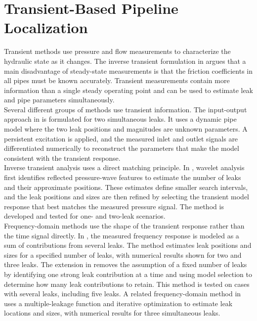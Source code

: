 \section{Transient-Based Pipeline Localization}
\label{sec:lit:transients}

Transient methods use pressure and flow measurements to characterize the hydraulic state as it changes. The inverse transient formulation in \cite{liggett1994} argues that a main disadvantage of steady-state measurements is that the friction coefficients in all pipes must be known accurately. Transient measurements contain more information than a single steady operating point and can be used to estimate leak and pipe parameters simultaneously. \\

Several different groups of methods use transient information. The input-output approach in \cite{diaz2021} is formulated for two simultaneous leaks. It uses a dynamic pipe model where the two leak positions and magnitudes are unknown parameters. A persistent excitation is applied, and the measured inlet and outlet signals are differentiated numerically to reconstruct the parameters that make the model consistent with the transient response.\\

Inverse transient analysis uses a direct matching principle. In \cite{nadian2025}, wavelet analysis first identifies reflected pressure-wave features to estimate the number of leaks and their approximate positions. These estimates define smaller search intervals, and the leak positions and sizes are then refined by selecting the transient model response that best matches the measured pressure signal. The method is developed and tested for one- and two-leak scenarios.\\

Frequency-domain methods use the shape of the transient response rather than the time signal directly. In \cite{wang2018}, the measured frequency response is modeled as a sum of contributions from several leaks. The method estimates leak positions and sizes for a specified number of leaks, with numerical results shown for two and three leaks. The extension in \cite{wang2019} removes the assumption of a fixed number of leaks by identifying one strong leak contribution at a time and using model selection to determine how many leak contributions to retain. This method is tested on cases with several leaks, including five leaks. A related frequency-domain method in \cite{kim2018} uses a multiple-leakage function and iterative optimization to estimate leak locations and sizes, with numerical results for three simultaneous leaks.\\

